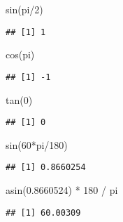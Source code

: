 \documentclass[
]{article}
\newenvironment{Shaded}{\begin{snugshade}}{\end{snugshade}}
\newcommand{\DecValTok}[1]{\textcolor[rgb]{0.00,0.00,0.81}{#1}}
\newcommand{\FloatTok}[1]{\textcolor[rgb]{0.00,0.00,0.81}{#1}}
\newcommand{\FunctionTok}[1]{\textcolor[rgb]{0.00,0.00,0.00}{#1}}
\newcommand{\NormalTok}[1]{#1}
\newcommand{\SpecialCharTok}[1]{\textcolor[rgb]{0.00,0.00,0.00}{#1}}
\begin{document}
\begin{Shaded}
\begin{Highlighting}[]
\FunctionTok{sin}\NormalTok{(pi}\SpecialCharTok{/}\DecValTok{2}\NormalTok{)}
\end{Highlighting}
\end{Shaded}

\begin{verbatim}
## [1] 1
\end{verbatim}

\begin{Shaded}
\begin{Highlighting}[]
\FunctionTok{cos}\NormalTok{(pi)}
\end{Highlighting}
\end{Shaded}

\begin{verbatim}
## [1] -1
\end{verbatim}

\begin{Shaded}
\begin{Highlighting}[]
\FunctionTok{tan}\NormalTok{(}\DecValTok{0}\NormalTok{)}
\end{Highlighting}
\end{Shaded}

\begin{verbatim}
## [1] 0
\end{verbatim}

\begin{Shaded}
\begin{Highlighting}[]
\FunctionTok{sin}\NormalTok{(}\DecValTok{60}\SpecialCharTok{*}\NormalTok{pi}\SpecialCharTok{/}\DecValTok{180}\NormalTok{)}
\end{Highlighting}
\end{Shaded}

\begin{verbatim}
## [1] 0.8660254
\end{verbatim}

\begin{Shaded}
\begin{Highlighting}[]
\FunctionTok{asin}\NormalTok{(}\FloatTok{0.8660524}\NormalTok{) }\SpecialCharTok{*} \DecValTok{180} \SpecialCharTok{/}\NormalTok{ pi}
\end{Highlighting}
\end{Shaded}

\begin{verbatim}
## [1] 60.00309
\end{verbatim}
\end{document}
